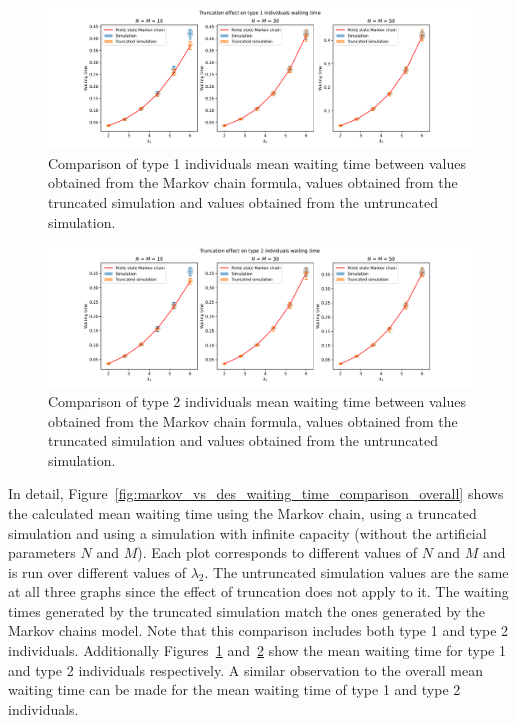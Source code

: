 \begin{figure}[H]
    \includegraphics[width=\textwidth]{chapters/03_queueing_model/img/numeric_results_and_timings/truncation_effect/waiting_time_type_1.pdf}
    \caption{
        Comparison of type 1 individuals mean waiting time between values
        obtained from the Markov chain formula, values obtained from the
        truncated simulation and values obtained from the untruncated
        simulation.
    }
    \label{fig:markov_vs_des_waiting_time_comparison_type_1}
\end{figure}

\begin{figure}[H]
    \includegraphics[width=\textwidth]{chapters/03_queueing_model/img/numeric_results_and_timings/truncation_effect/waiting_time_type_2.pdf}
    \caption{
        Comparison of type 2 individuals mean waiting time between values
        obtained from the Markov chain formula, values obtained from the
        truncated simulation and values obtained from the untruncated
        simulation.
    }
    \label{fig:markov_vs_des_waiting_time_comparison_type_2}
\end{figure}

In detail, Figure~\ref{fig:markov_vs_des_waiting_time_comparison_overall} shows
the calculated mean waiting time using the Markov chain, using a truncated 
simulation and using a simulation with infinite capacity (without the artificial
parameters \(N\) and \(M\)).
Each plot corresponds to different values of \(N\) and \(M\) and is run over 
different values of \(\lambda_2\).
The untruncated simulation values are the same at all three graphs since
the effect of truncation does not apply to it.
The waiting times generated by the truncated simulation match the ones generated 
by the Markov chains model.
Note that this comparison includes both type 1 and type 2 individuals.
Additionally Figures~\ref{fig:markov_vs_des_waiting_time_comparison_type_1}
and~\ref{fig:markov_vs_des_waiting_time_comparison_type_2} show the mean waiting
time for type 1 and type 2 individuals respectively.
A similar observation to the overall mean waiting time can be made for the mean
waiting time of type 1 and type 2 individuals.



